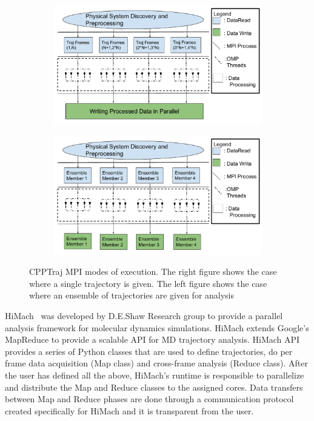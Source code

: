 \begin{figure}[ht!]
		\begin{subfigure}{.5\textwidth}
		\centering
		\includegraphics[width=.95\textwidth]{figures/CPPTrajExecutionSchematicSingleTrajectory.pdf}
	\end{subfigure}
	\begin{subfigure}{.5\textwidth}
		\centering
		\includegraphics[width=.95\linewidth]{figures/CPPTrajExecutionSchematicEnsembleTrajectories.pdf}
	\end{subfigure}
	\caption{CPPTraj MPI modes of execution. The right figure shows the case where a single trajectory is
		given. The left figure shows the case where an ensemble of trajectories are given for analysis}
	\label{fig:cpptraj_arch}
\end{figure}

HiMach~\cite{himach-2008} was developed by D.E.Shaw Research group to provide a parallel analysis
framework for molecular dynamics simulations. HiMach extends Google's MapReduce
to provide a scalable API for MD trajectory analysis. HiMach API provides a series
of Python classes that are used to define trajectories, do per frame data acquisition
(Map class) and cross-frame analysis (Reduce class). After the user has defined all 
the above, HiMach's runtime is responsible to parallelize and distribute the Map and 
Reduce classes to the assigned cores. Data transfers between Map and Reduce phases are
done through a communication protocol created specifically for HiMach and it is transparent
from the user.